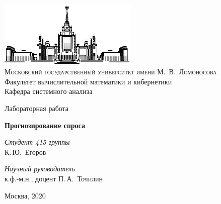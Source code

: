 \thispagestyle{empty}
\begin{center}
    \ \vspace{-3cm}

    \includegraphics[width=0.5\textwidth]{title_page/msu.eps}\\

    {\small{\scshape  Московский государственный университет имени М.~В.~Ломоносова}\\
    Факультет вычислительной математики и кибернетики\\
    Кафедра системного анализа}

    \vfill

    {\Large Лабораторная работа}

    \vspace{1cm}

    {\LARGE\bfseries Прогнозирование спроса}
\end{center}

\vspace{3cm}

\begin{flushright}
    \large
    \textit{Студент 415 группы}\\
    К.\,Ю.~Егоров

    \vspace{5mm}

    \textit{Научный руководитель}\\
    к.ф.-м.н., доцент П.\,А.~Точилин
\end{flushright}

\vfill

\begin{center}
    Москва, 2020
\end{center}

\clearpage